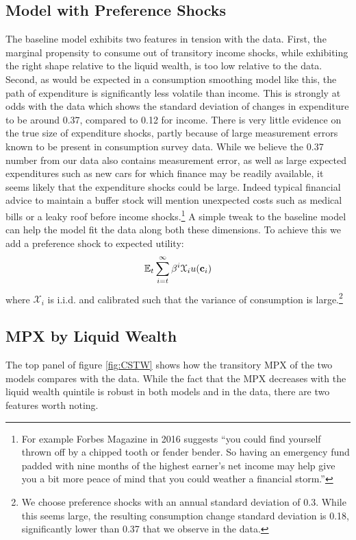 \documentclass[titlepage]{\econtex}\newcommand{\texname}{ConsumptionHeterogeneity}
\begin{document}
\subsection{Model with Preference Shocks}
The baseline model exhibits two features in tension with the data. First, the marginal propensity to consume out of transitory income shocks, while exhibiting the right shape relative to the liquid wealth, is too low relative to the data. Second, as would be expected in a consumption smoothing model like this, the path of expenditure is significantly less volatile than income. This is strongly at odds with the data which shows the standard deviation of changes in expenditure to be around 0.37, compared to 0.12 for income. There is very little evidence on the true size of expenditure shocks, partly because of large measurement errors known to be present in consumption survey data. While we believe the 0.37 number from our data also contains measurement error, as well as large expected expenditures such as new cars for which finance may be readily available, it seems likely that the expenditure shocks could be large. Indeed typical financial advice to maintain a buffer stock will mention unexpected costs such as medical bills or a leaky roof before income shocks.\footnote{For example Forbes Magazine in 2016 suggests ``you could find yourself thrown off by a chipped tooth or fender bender. So having an emergency fund padded with nine months of the highest earner's net income may help give you a bit more peace of mind that you could weather a financial storm.''} A simple tweak to the baseline model can help the model fit the data along both these dimensions. To achieve this we add a preference shock to expected utility:
\begin{align*}
\mathbb{E}_t \sum_{i=t}^{\infty} \beta^i \mathcal{X}_i u(\mathbf{c}_i)
\end{align*}
where $\mathcal{X}_i$ is i.i.d. and calibrated such that the variance of consumption is large.\footnote{We choose preference shocks with an annual standard deviation of 0.3. While this seems large, the resulting consumption change standard deviation is 0.18, significantly lower than 0.37 that we observe in the data.}

\subsection{MPX by Liquid Wealth}
The top panel of figure \ref{fig:CSTW} shows how the transitory MPX of the two models compares with the data. While the fact that the MPX decreases with the liquid wealth quintile is robust in both models and in the data, there are two features worth noting. 
\end{document}
